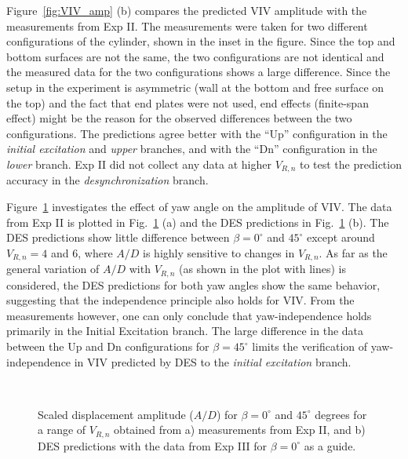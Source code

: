 Figure~\ref{fig:VIV_amp} (b) compares the predicted VIV amplitude with the
measurements from Exp II. The measurements were taken for two different
configurations of the cylinder, shown in the inset in the figure. Since the top
and bottom surfaces are not the same, the two configurations are not identical
and the measured data for the two configurations shows a large difference.
Since the setup in the experiment is asymmetric (wall at the bottom and free
surface on the top) and the fact that end plates were not used, end effects
(finite-span effect) might be the reason for the observed differences between
the two configurations. The predictions agree better with the ``Up''
configuration in the {\em initial excitation} and {\em upper} branches, and
with the ``Dn'' configuration in the {\em lower} branch. Exp II did not collect
any data at higher $V_{R,n}$ to test the prediction accuracy in the {\em
desynchronization} branch.

Figure~\ref{fig:VIV_yaw} investigates the effect of yaw angle on the amplitude
of VIV. The data from Exp II is plotted in Fig.~\ref{fig:VIV_yaw} (a) and the
DES predictions in Fig.~\ref{fig:VIV_yaw} (b). The DES predictions show little
difference between $\beta=0^\circ$ and $45^\circ$ except around $V_{R,n}=4$ and
$6$, where $A/D$ is highly sensitive to changes in $V_{R,n}$. As far as the
general variation of $A/D$ with $V_{R,n}$ (as shown in the plot with lines) is
considered, the DES predictions for both yaw angles show the same behavior,
suggesting that the independence principle also holds for VIV. From the
measurements however, one can only conclude that yaw-independence holds
primarily in the Initial Excitation branch. The large difference in the data
between the Up and Dn configurations for $\beta=45^\circ$ limits the
verification of yaw-independence in VIV predicted by DES to the {\em initial
excitation} branch.
%
\begin{figure}[htb!]
  \qquad
     {} \\
  \caption{Scaled displacement amplitude ($A/D$) for $\beta=0^\circ$ and
    $45^\circ$ degrees for a range of $V_{R,n}$ obtained from a) measurements
    from Exp II, and b) DES predictions with the data from Exp III for
    $\beta=0^\circ$ as a guide.}
  \label{fig:VIV_yaw}
\end{figure}

